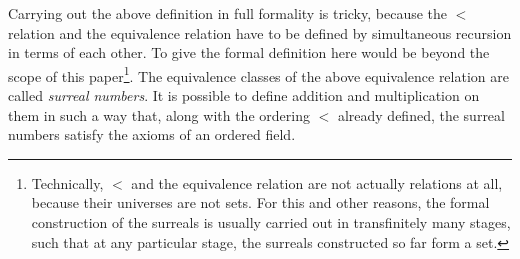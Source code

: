 \documentclass[twoside,11pt]{article}
\begin{document}
Carrying out the above definition in full formality is tricky,
because the $<$ relation and the equivalence relation have to be
defined by simultaneous recursion in terms of each other.
To give the formal definition here would be beyond the scope of this
paper\footnote{Technically, $<$ and the equivalence relation are not actually
relations at all, because their
universes are not sets. For this and other reasons, the formal construction of the surreals
is usually carried out in transfinitely many stages, such that at any particular stage,
the surreals constructed so far form a set.}.
The equivalence classes of the above equivalence relation are called
\emph{surreal numbers}. It is possible to define addition and multiplication
on them in such a way that, along with the ordering $<$ already defined,
the surreal numbers satisfy the axioms of an ordered field.
\end{document}

